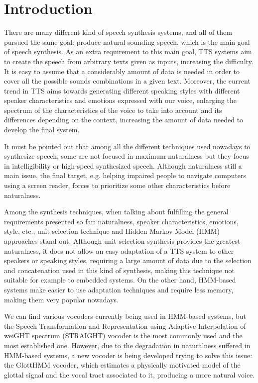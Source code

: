 \section{Introduction}
\label{intro}
\thispagestyle{empty}

There are many different kind of speech synthesis systems, and all of them pursued the same goal: produce natural sounding speech, which is the main goal of speech synthesis. As an extra requirement to this main goal, TTS systems aim to create the speech from arbitrary texts given as inputs, increasing the difficulty. It is easy to assume that a considerably amount of data is needed in order to cover all the possible sounds combinations in a given text. Moreover, the current trend in TTS aims towards generating different speaking styles with different speaker characteristics and emotions expressed with our voice, enlarging the spectrum of the characteristics of the voice to take into account and its differences depending on the context, increasing the amount of data needed to develop the final system. 

It must be pointed out that among all the different techniques used nowadays to synthesize speech, some are not focused in maximum naturalness but they focus in intelligibility or high-speed synthesized speech. Although naturalness still a main issue, the final target, e.g. helping impaired people to navigate computers using a screen reader, forces to prioritize some other characteristics before naturalness. 

Among the synthesis techniques, when talking about fulfilling the general requirements presented so far: naturalness, speaker characteristics, emotions, style, etc., unit selection technique and Hidden Markov Model (HMM) approaches stand out. Although unit selection synthesis provides the greatest naturalness, it does not allow an easy adaptation of a TTS system to other speakers or speaking styles, requiring a large amount of data due to the selection and concatenation used in this kind of synthesis, making this technique not suitable for example to embedded systems. On the other hand, HMM-based systems make easier to use adaptation techniques and require less memory, making them very popular nowadays.

We can find various vocoders currently being used in HMM-based systems, but the Speech Transformation and Representation using Adaptive Interpolation of weiGHT spectrum (STRAIGHT) vocoder is the most commonly used and the most established one. However, due to the degradation in naturalness suffered in HMM-based systems, a new vocoder is being developed trying to solve this issue: the GlottHMM vocoder, which estimates a physically motivated model of the glottal signal and the vocal tract associated to it, producing a more natural voice. 

